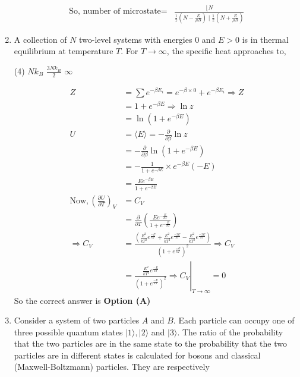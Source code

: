 \begin{enumerate}
\begin{answer}
\begin{align*}
\text{So, number of microstate}=&\frac{\lfloor N}{\frac{1}{2}\left(N-\frac{E}{\mu B}\right) \mid \frac{1}{2}\left(N+\frac{E}{\mu B}\right)}
\end{align*}
\end{answer}
	\item A collection of $N$ two-level systems with energies 0 and $E>0$ is in thermal
	equilibrium at temperature $T$. For $T \rightarrow \infty$, the specific heat approaches to,
\begin{tasks}(4)
\task[\textbf{B.}] $N k_{B}$
\task[\textbf{C.}] $\frac{3 N k_{B}}{2}$
\task[\textbf{D.}] $\infty$
\end{tasks}
\begin{answer}
\begin{align*}
Z&=\sum e^{-\beta E_{i}}=e^{-\beta \times 0}+e^{-\beta E_{i}} \Rightarrow Z\\&=1+e^{-\beta E} \Rightarrow \ln z\\&=\ln \left(1+e^{-\beta E}\right)\\
U&=\langle E\rangle=-\frac{\partial}{\partial \beta} \ln z\\&=-\frac{\partial}{\partial \beta} \ln \left(1+e^{-\beta E}\right)\\&=-\frac{1}{1+e^{-\beta E}} \times e^{-\beta E}(-E)\\&=\frac{E e^{-\beta E}}{1+e^{-\beta E}}\\
\text{Now},\left(\frac{\partial U}{\partial T}\right)_{V}&=C_{V}\\
&=\frac{\partial}{\partial T}\left(\frac{E e^{-\frac{E}{k T}}}{1+e^{-\frac{E}{k T}}}\right)\\
\Rightarrow C_{V}&=\frac{\left(\frac{E^{2}}{k T^{2}} e^{\frac{-E}{k T}}+\frac{E^{2}}{k T^{2}} e^{\frac{-2 E}{k T}}-\frac{E^{2}}{k T^{2}} e^{\frac{-2 E}{k T}}\right)}{\left(1+e^{\frac{-E}{k T}}\right)^{2}} \Rightarrow C_{V}\\
&=\left.\frac{\frac{E^{2}}{k T^{2}} e^{\frac{-E}{k T}}}{\left(1+e^{\frac{-E}{k T}}\right)^{2}} \Rightarrow C_{V}\right|_{T \rightarrow \infty}=0
\end{align*}
So the correct answer is \textbf{Option (A)}
\end{answer}
\item 	Consider a system of two particles $A$ and $B$. Each particle can occupy one of three possible quantum states $|1\rangle,|2\rangle$ and $|3\rangle$. The ratio of the probability that the two particles
are in the same state to the probability that the two particles are in different states is calculated for bosons and classical (Maxwell-Boltzmann) particles. They are respectively

\end{enumerate}
